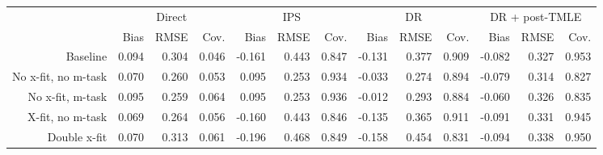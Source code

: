 \begin{tabular}{*{13}{r}} 
\toprule 
& \multicolumn{3}{c}{Direct} & \multicolumn{3}{c}{IPS} & \multicolumn{3}{c}{DR} & \multicolumn{3}{c}{DR + post-TMLE} \\ 
\cmidrule(lr){2-4} \cmidrule(lr){5-7} \cmidrule(lr){8-10} \cmidrule(lr){11-13} 
&  Bias &  RMSE &  Cov. &  Bias &  RMSE &  Cov. &  Bias &  RMSE &  Cov. &  Bias &  RMSE &  Cov. \\ 
\midrule
Baseline & 0.094 & 0.304 & 0.046 & -0.161 & 0.443 & 0.847 & -0.131 & 0.377 & 0.909 & -0.082 & 0.327 & 0.953 \\ 
No x-fit, no m-task & 0.070 & 0.260 & 0.053 & 0.095 & 0.253 & 0.934 & -0.033 & 0.274 & 0.894 & -0.079 & 0.314 & 0.827 \\ 
No x-fit, m-task & 0.095 & 0.259 & 0.064 & 0.095 & 0.253 & 0.936 & -0.012 & 0.293 & 0.884 & -0.060 & 0.326 & 0.835 \\ 
X-fit, no m-task & 0.069 & 0.264 & 0.056 & -0.160 & 0.443 & 0.846 & -0.135 & 0.365 & 0.911 & -0.091 & 0.331 & 0.945 \\ 
Double x-fit & 0.070 & 0.313 & 0.061 & -0.196 & 0.468 & 0.849 & -0.158 & 0.454 & 0.831 & -0.094 & 0.338 & 0.950 \\ 
\bottomrule 
 \end{tabular}